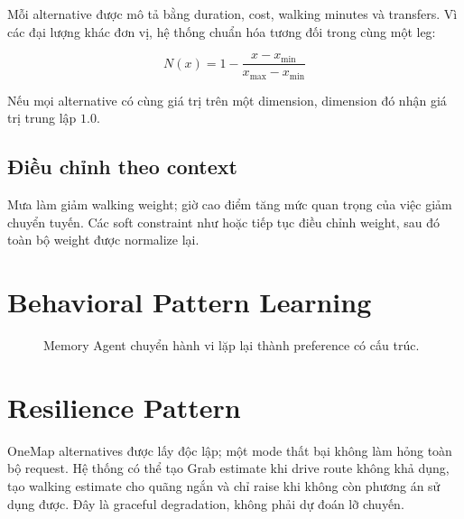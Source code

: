 Mỗi alternative được mô tả bằng duration, cost, walking minutes và transfers. Vì các đại lượng khác đơn vị, hệ thống chuẩn hóa tương đối trong cùng một leg:

\[
N(x) = 1 - \frac{x - x_{\min}}{x_{\max} - x_{\min}}
\]

Nếu mọi alternative có cùng giá trị trên một dimension, dimension đó nhận giá trị trung lập \(1.0\).

\subsection{Điều chỉnh theo context}

Mưa làm giảm walking weight; giờ cao điểm tăng mức quan trọng của việc giảm chuyển tuyến. Các soft constraint như  hoặc  tiếp tục điều chỉnh weight, sau đó toàn bộ weight được normalize lại.

\section{Behavioral Pattern Learning}

\begin{figure}[H]
\centering
{}
\caption{Memory Agent chuyển hành vi lặp lại thành preference có cấu trúc.}
\label{fig:memory-pattern}
\end{figure}

\section{Resilience Pattern}

OneMap alternatives được lấy độc lập; một mode thất bại không làm hỏng toàn bộ request. Hệ thống có thể tạo Grab estimate khi drive route không khả dụng, tạo walking estimate cho quãng ngắn và chỉ raise  khi không còn phương án sử dụng được. Đây là graceful degradation, không phải dự đoán lỡ chuyến.
